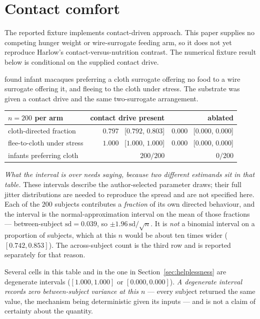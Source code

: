 \documentclass[11pt,a4paper]{article}
\theoremstyle{remark}
\begin{document}
\section{Contact comfort}\label{sec:harlow}
The reported fixture implements contact-driven approach. This paper supplies
no competing hunger weight or wire-surrogate feeding arm, so it does not yet
reproduce Harlow's contact-versus-nutrition contrast. The numerical fixture
result below is conditional on the supplied contact drive.

\citet{harlow1958} found infant macaques preferring a cloth surrogate offering no food to a wire
surrogate offering it, and fleeing to the cloth under stress. The substrate was given a contact
drive and the same two-surrogate arrangement.

\begin{center}\small
\begin{tabular}{@{}lrr@{}}
\toprule
$n=200$ per arm & \textbf{contact drive present} & \textbf{ablated}\\
\midrule
cloth-directed fraction & $0.797$ \ [$0.792$, $0.803$] & $0.000$ \ [$0.000$, $0.000$]\\
flee-to-cloth under stress & $1.000$ \ [$1.000$, $1.000$] & $0.000$ \ [$0.000$, $0.000$]\\
infants preferring cloth & $200/200$ & $0/200$\\
\bottomrule
\end{tabular}
\end{center}

\emph{What the interval is over needs saying, because two different estimands sit in that table.}
These intervals describe the author-selected parameter draws; their full jitter distributions are needed to reproduce the spread and are not specified here. Each of the $200$ subjects contributes a \emph{fraction} of its own directed behaviour, and the
interval is the normal-approximation interval on the mean of those fractions --- between-subject
$\mathrm{sd}=0.039$, so $\pm 1.96\,\mathrm{sd}/\sqrt{n}$. It is \emph{not} a binomial interval on a
proportion of subjects, which at this $n$ would be about ten times wider ($[0.742, 0.853]$). The
across-subject count is the third row and is reported separately for that reason.

Several cells in this table and in the one in Section~\ref{sec:helplessness} are degenerate
intervals ($[1.000, 1.000]$ or $[0.000, 0.000]$). \emph{A degenerate interval records zero
between-subject variance at this $n$} --- every subject returned the same value, the mechanism
being deterministic given its inputs --- and is not a claim of certainty about the quantity.
\end{document}
